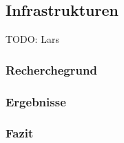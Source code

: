 \subsection{Infrastrukturen}

TODO: Lars

\subsubsection{Recherchegrund}


\subsubsection{Ergebnisse}



\subsubsection{Fazit}

\clearpage 





